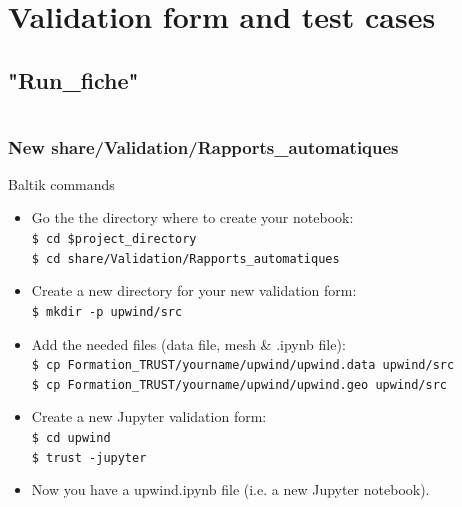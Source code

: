 \documentclass[10pt, hyperref={unicode=true,pdfusetitle, bookmarks=true,bookmarksnumbered=false,bookmarksopen=false, breaklinks=false,pdfborder={0 0 1},backref=true,colorlinks=true,linkcolor=darkblue,pageanchor, urlcolor=darkblue}]{beamer}
\begin{document}
\section{{\bf{Validation form and test cases}}}
\subsection{{\bf{"Run\_fiche"}}}
\begin{frame}
\begin{columns}[c] 
\tableofcontents[sections={1-4},currentsection, currentsubsection]
\tableofcontents[sections={5-10},currentsection, currentsubsection]
\end{columns}
\end{frame}
\begin{frame}
\frametitle{New share/Validation/Rapports\_automatiques}
\begin{block}{Baltik commands}

\begin{itemize}

\item Go the the directory where to create your notebook:\\
\texttt{\$ cd \$project\_directory}\\
\texttt{\$ cd share/Validation/Rapports\_automatiques}

\item Create a new directory for your new validation form:\\
\texttt{\$ mkdir -p upwind/src}

\item Add the needed files (data file, mesh \& .ipynb file):\\
\texttt{\$ cp Formation\_TRUST/yourname/upwind/upwind.data upwind/src}\\
\texttt{\$ cp Formation\_TRUST/yourname/upwind/upwind.geo upwind/src}

\item Create a new Jupyter validation form:\\
\texttt{\$ cd upwind}\\
\texttt{\$ trust -jupyter}
\item Now you have a upwind.ipynb file (i.e. a new Jupyter notebook).

\end{itemize}

\end{block}
\end{frame}
\end{document}
